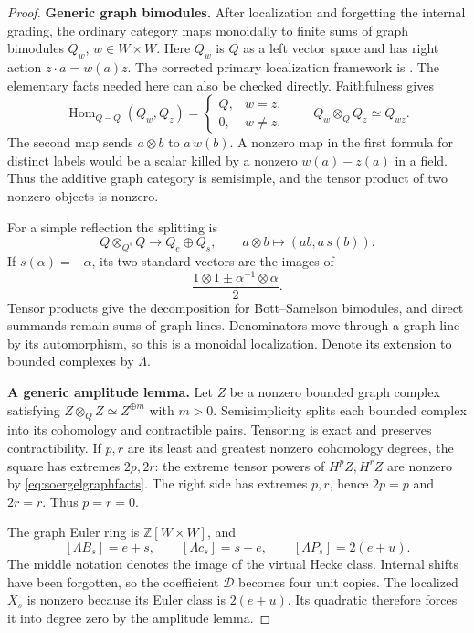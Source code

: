\begin{proof}
\par\smallskip\noindent\textbf{Generic graph bimodules.}\quad
After localization and forgetting the internal grading, the
ordinary category maps monoidally to finite sums of graph
bimodules \(Q_w\), \(w\in W\times W\). Here \(Q_w\)
is \(Q\) as a left vector space and has right action
\(z\cdot a=w(a)z\). The corrected primary localization
framework is \cite[\S1.1, pp.~3--4; \S1.2,
Theorem~1.6 and Remark~1.7, pp.~4--5;
\S2.1, equations~(2.1)--(2.6), p.~7]{EWLocalized}.
The elementary facts needed here can also be checked directly.
Faithfulness gives
\begin{equation}\label{eq:soergelgraphfacts}
 \operatorname{Hom}_{Q-Q}(Q_w,Q_z)=
 \begin{cases}Q,&w=z,\\0,&w\ne z,\end{cases}
 \qquad Q_w\otimes_Q Q_z\simeq Q_{wz}.
\end{equation}
The second map sends \(a\otimes b\) to \(a\,w(b)\).
A nonzero map in the first formula for distinct labels would
be a scalar killed by a nonzero \(w(a)-z(a)\) in a field.
Thus the additive graph category is semisimple, and the
tensor product of two nonzero objects is nonzero.

For a simple reflection the splitting is
\[
 Q\otimes_{Q^s}Q\longrightarrow Q_e\oplus Q_s,
 \qquad a\otimes b\longmapsto(ab,a\,s(b)).
\]
If \(s(\alpha)=-\alpha\), its two standard vectors are
the images of
\[
       \frac{1\otimes1\pm\alpha^{-1}\otimes\alpha}{2}.
\]
Tensor products give the decomposition for Bott--Samelson
bimodules, and direct summands remain sums of graph lines.
Denominators move through a graph line by its automorphism,
so this is a monoidal localization. Denote its extension
to bounded complexes by \(\Lambda\).

\par\smallskip\noindent\textbf{A generic amplitude lemma.}\quad
Let \(Z\) be a nonzero bounded graph complex satisfying
\(Z\otimes_Q Z\simeq Z^{\oplus m}\) with \(m>0\).
Semisimplicity splits each bounded complex into its
cohomology and contractible pairs. Tensoring is exact and
preserves contractibility. If \(p,r\) are its least and
greatest nonzero cohomology degrees, the square has
extremes \(2p,2r\): the extreme tensor powers of
\(H^pZ,H^rZ\) are nonzero by
\eqref{eq:soergelgraphfacts}. The right side has extremes
\(p,r\), hence \(2p=p\) and \(2r=r\). Thus \(p=r=0\).

The graph Euler ring is \(\mathbb Z[W\times W]\), and
\[
 [\Lambda B_s]=e+s,\qquad
 [\Lambda c_s]=s-e,\qquad
 [\Lambda P_s]=2(e+u).
\]
The middle notation denotes the image of the virtual
Hecke class. Internal shifts have been forgotten, so the
coefficient \(\mathscr D\) becomes four unit copies.
The localized \(X_s\) is nonzero because its Euler class
is \(2(e+u)\). Its quadratic therefore forces it into
degree zero by the amplitude lemma.


\end{proof}
